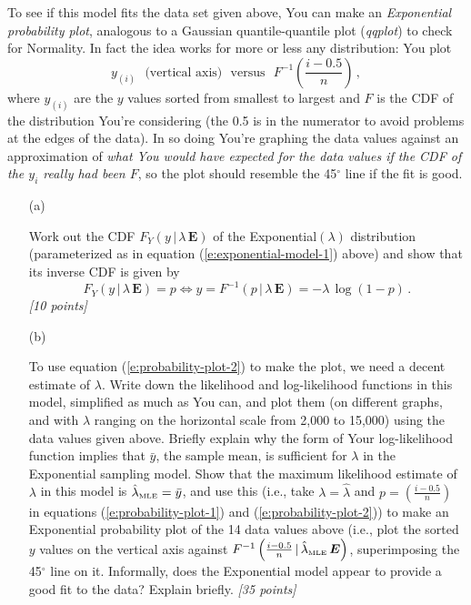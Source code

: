 \documentclass[12pt]{article}
\newcommand{\given}{\, | \,}
\begin{document}
\begin{itemize}
\begin{itemize}
To see if this model fits the data set given above, You can make an \textit{Exponential probability plot}, analogous to a Gaussian quantile-quantile plot (\textit{qqplot}) to check for Normality. In fact the idea works for more or less any distribution: You plot 
\begin{equation} \label{e:probability-plot-1}
y_{ ( i ) } \ \ \ \mbox{(vertical axis)} \ \ \ \mbox{versus} \ \ \ F^{ -1 } \left( \frac{ i - 0.5 }{ n }
\right) \, ,
\end{equation}
where $y_{ ( i ) }$ are the $y$ values sorted from smallest to largest and $F$ is the CDF of the distribution You're considering (the 0.5 is in the numerator to avoid problems at the edges of the data). In so doing You're graphing the data values against an approximation of \textit{what You would have expected for the data values if the CDF of the $y_i$ really had been $F$}, so the plot should resemble the 45$^\circ$ line if the fit is good.  

\begin{itemize}

\item[(a)] 

Work out the CDF $F_Y ( y \given \lambda \, \bm{ E } )$ of the Exponential$( \lambda )$ distribution (parameterized as in equation (\ref{e:exponential-model-1}) above)
and show that its inverse CDF is given by
\begin{equation} \label{e:probability-plot-2}
F_Y ( y \given \lambda \, \bm{ E } ) = p \iff y = F^{ -1 }( p \given \lambda \, \bm{ E } ) = - \lambda \, \log ( 1 - p ) \, .
\end{equation}
\textit{[10 points]} 

\item[(b)] 

To use equation (\ref{e:probability-plot-2}) to make the plot, we need a decent estimate of $\lambda$. Write down the likelihood and log-likelihood functions in this model, simplified as much as You can, and plot them (on different graphs, and with $\lambda$ ranging on the horizontal scale from 2,000 to 15,000) using the data values given above. Briefly explain why the form of Your log-likelihood function implies that $\bar{ y }$, the sample mean, is sufficient for $\lambda$ in the Exponential sampling model. Show that the maximum likelihood estimate of $\lambda$ in this model is $\hat{ \lambda }_{\mbox{\tiny MLE}} = \bar{ y }$, and use this (i.e., take $\lambda = \hat{ \lambda }$ and $p = \left( \frac{ i - 0.5 }{ n } \right)$ in equations (\ref{e:probability-plot-1}) and (\ref{e:probability-plot-2})) to make an Exponential probability plot of the 14 data values above (i.e., plot the sorted $y$ values on the vertical axis against $F^{ -1 } \left( \frac{ i - 0.5 }{ n } \given \hat{ \lambda }_{\mbox{\tiny MLE}} \, \bm{ E } \right)$, superimposing the 45$^\circ$ line on it. Informally, does the Exponential model appear to provide a good fit to the data? Explain briefly. \textit{[35 points]} 


\end{itemize}
\end{itemize}
\end{itemize}
\end{document}
